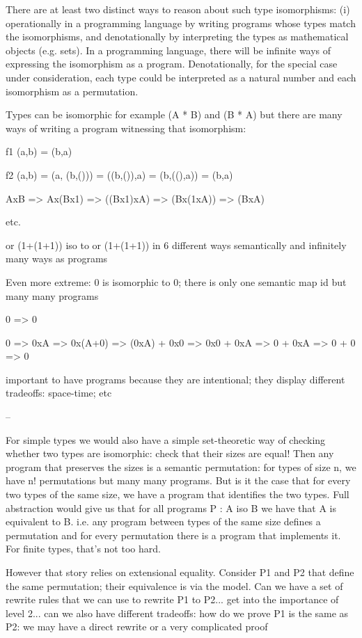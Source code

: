 There are at least two distinct ways to reason about such type isomorphisms: (i)
operationally in a programming language by writing programs whose types match
the isomorphisms, and denotationally by interpreting the types as mathematical
objects (e.g. sets). In a programming language, there will be infinite ways of
expressing the isomorphism as a program. Denotationally, for the special case
under consideration, each type could be interpreted as a natural number and each
isomorphism as a permutation.




Types can be isomorphic for example (A * B) and (B * A) but
there are many ways of writing a program witnessing that isomorphism:

f1 (a,b) = (b,a)

f2 (a,b) = (a, (b,())) = ((b,()),a) = (b,((),a)) = (b,a)

AxB => Ax(Bx1) => ((Bx1)xA) => (Bx(1xA)) => (BxA)

etc.

or (1+(1+1)) iso to or (1+(1+1)) in 6 different ways semantically and infinitely
many ways as programs

Even more extreme: 0 is isomorphic to 0; there is only one semantic map id but
many many programs

0 => 0

0 => 0xA => 0x(A+0) => (0xA) + 0x0 => 0x0 + 0xA => 0 + 0xA => 0 + 0 => 0

important to have programs because they are intentional; they display different
tradeoffs: space-time; etc

--

For simple types we would also have a simple set-theoretic way of checking
whether two types are isomorphic: check that their sizes are equal! Then any
program that preserves the sizes is a semantic permutation: for types of size n,
we have n! permutations but many many programs. But is it the case that for
every two types of the same size, we have a program that identifies the two
types.  Full abstraction would give us that for all programs P : A iso B we have
that A is equivalent to B. i.e. any program between types of the same size
defines a permutation and for every permutation there is a program that
implements it. For finite types, that's not too hard.


However that story relies on extensional equality. Consider P1 and P2 that
define the same permutation; their equivalence is via the model. Can we have a
set of rewrite rules that we can use to rewrite P1 to P2... get into the
importance of level 2... can we also have different tradeoffs: how do we prove
P1 is the same as P2: we may have a direct rewrite or a very complicated proof

